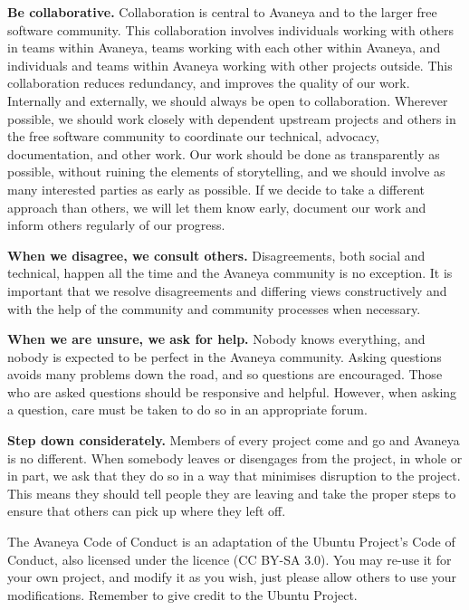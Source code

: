 \item
{\bf Be collaborative.} Collaboration is central to Avaneya and to the larger free software community. This collaboration involves individuals working with others in teams within Avaneya, teams working with each other within Avaneya, and individuals and teams within Avaneya working with other projects outside. This collaboration reduces redundancy, and improves the quality of our work. Internally and externally, we should always be open to collaboration. Wherever possible, we should work closely with dependent upstream projects and others in the free software community to coordinate our technical, advocacy, documentation, and other work. Our work should be done as transparently as possible, without ruining the elements of storytelling, and we should involve as many interested parties as early as possible. If we decide to take a different approach than others, we will let them know early, document our work and inform others regularly of our progress.

\item
{\bf When we disagree, we consult others.} Disagreements, both social and technical, happen all the time and the Avaneya community is no exception. It is important that we resolve disagreements and differing views constructively and with the help of the community and community processes when necessary.

\item
{\bf When we are unsure, we ask for help.} Nobody knows everything, and nobody is expected to be perfect in the Avaneya community. Asking questions avoids many problems down the road, and so questions are encouraged. Those who are asked questions should be responsive and helpful. However, when asking a question, care must be taken to do so in an appropriate forum.

\item
{\bf Step down considerately.} Members of every project come and go and Avaneya is no different. When somebody leaves or disengages from the project, in whole or in part, we ask that they do so in a way that minimises disruption to the project. This means they should tell people they are leaving and take the proper steps to ensure that others can pick up where they left off.
\stopitemize

The Avaneya Code of Conduct is an adaptation of the Ubuntu Project's Code of Conduct, also licensed under the  licence (CC BY-SA 3.0). You may re-use it for your own project, and modify it as you wish, just please allow others to use your modifications. Remember to give credit to the Ubuntu Project.

